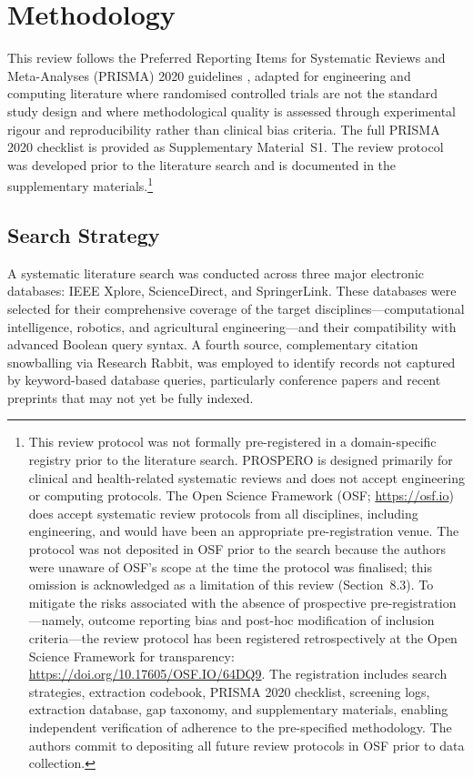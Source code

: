 \documentclass[review,3p,times]{elsarticle}
\begin{document}
\section{Methodology}

This review follows the Preferred Reporting Items for Systematic Reviews and Meta-Analyses (PRISMA) 2020 guidelines \cite{page2021}, adapted for engineering and computing literature where randomised controlled trials are not the standard study design and where methodological quality is assessed through experimental rigour and reproducibility rather than clinical bias criteria. The full PRISMA 2020 checklist is provided as Supplementary Material~S1. The review protocol was developed prior to the literature search and is documented in the supplementary materials.\footnote{This review protocol was not formally pre-registered in a domain-specific 
registry prior to the literature search. PROSPERO is designed primarily for clinical 
and health-related systematic reviews and does not accept engineering or computing 
protocols. The Open Science Framework (OSF; \url{https://osf.io}) does accept 
systematic review protocols from all disciplines, including engineering, and would 
have been an appropriate pre-registration venue. The protocol was not deposited in 
OSF prior to the search because the authors were unaware of OSF's scope at the time 
the protocol was finalised; this omission is acknowledged as a limitation of this 
review (Section~8.3). To mitigate the risks associated with the absence of 
prospective pre-registration---namely, outcome reporting bias and post-hoc 
modification of inclusion criteria---the review protocol has been registered 
retrospectively at the Open Science Framework for transparency: 
\url{https://doi.org/10.17605/OSF.IO/64DQ9}. The registration includes search 
strategies, extraction codebook, PRISMA 2020 checklist, screening logs, extraction 
database, gap taxonomy, and supplementary materials, enabling independent 
verification of adherence to the pre-specified methodology. The authors commit to 
depositing all future review protocols in OSF prior to data collection.}

\subsection{Search Strategy}

A systematic literature search was conducted across three major electronic databases: IEEE Xplore, ScienceDirect, and SpringerLink. These databases were selected for their comprehensive coverage of the target disciplines---computational intelligence, robotics, and agricultural engineering---and their compatibility with advanced Boolean query syntax. A fourth source, complementary citation snowballing via Research Rabbit, was employed to identify records not captured by keyword-based database queries, particularly conference papers and recent preprints that may not yet be fully indexed.
\end{document}
